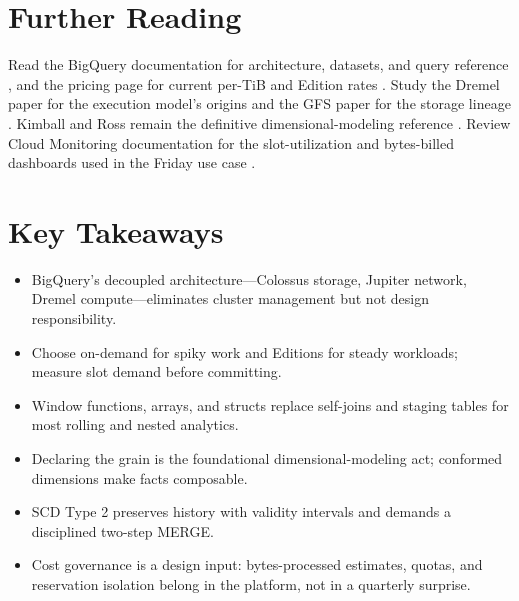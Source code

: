 \section{Further Reading}
Read the BigQuery documentation for architecture, datasets, and query reference \cite{googlecloudbigquerydocs}, and the pricing page for current per-TiB and Edition rates \cite{googlecloudbigquerypricing}. Study the Dremel paper for the execution model's origins \cite{melnik2010dremel} and the GFS paper for the storage lineage \cite{ghemawat2003gfs}. Kimball and Ross remain the definitive dimensional-modeling reference \cite{kimball2013toolkit}. Review Cloud Monitoring documentation for the slot-utilization and bytes-billed dashboards used in the Friday use case \cite{googlecloudmonitoringdocs}.

\section*{Key Takeaways}
\begin{itemize}
    \item BigQuery's decoupled architecture---Colossus storage, Jupiter network, Dremel compute---eliminates cluster management but not design responsibility.
    \item Choose on-demand for spiky work and Editions for steady workloads; measure slot demand before committing.
    \item Window functions, arrays, and structs replace self-joins and staging tables for most rolling and nested analytics.
    \item Declaring the grain is the foundational dimensional-modeling act; conformed dimensions make facts composable.
    \item SCD Type 2 preserves history with validity intervals and demands a disciplined two-step MERGE.
    \item Cost governance is a design input: bytes-processed estimates, quotas, and reservation isolation belong in the platform, not in a quarterly surprise.
\end{itemize}

